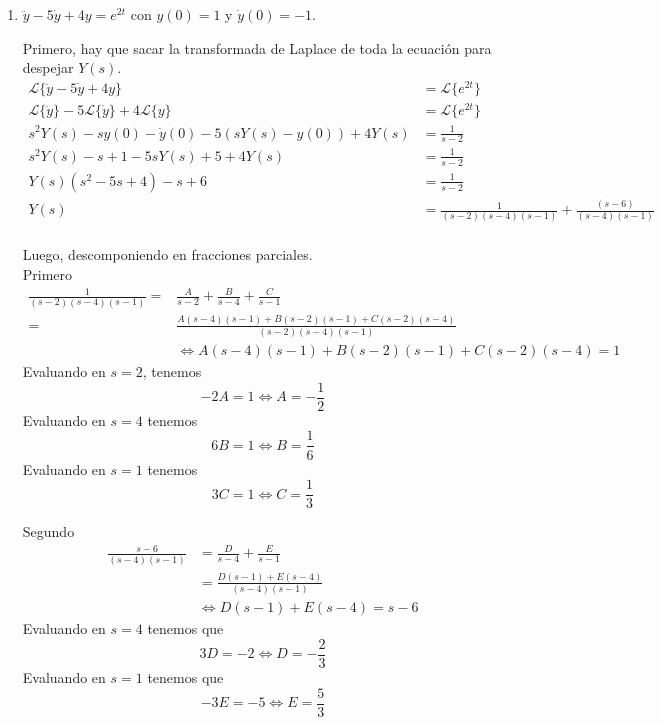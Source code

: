 \documentclass{article}
\begin{document}
\begin{enumerate}
        \item {
        	$\ddot y - 5 \dot y + 4y = e^{2t}$ con $y(0) = 1$ y $\dot y(0) = -1$.
        	
        	\color{azul}
        	Primero, hay que sacar la transformada de Laplace de toda la ecuación
        	para despejar $Y(s)$.
        	\begin{align*}
        	\mathcal{L}\{\ddot y - 5 \dot y + 4y\} &= \mathcal{L}\{e^{2t}\} \\
        	\mathcal{L}\{\ddot y\} - 5\mathcal{L}\{\dot y\} + 4 \mathcal{L}\{y\}
        	&= \mathcal{L}\{e^{2t}\} \\
        	s^2 Y(s) - s y(0) - \dot y(0) - 5 (sY(s) - y(0)) + 4Y(s) 
        	&= \frac{1}{s - 2} \\
        	s^2 Y(s) - s + 1 - 5s Y(s) + 5 + 4 Y(s) &= \frac{1}{s - 2} \\
        	Y(s) (s^2 - 5s + 4) - s + 6 &= \frac{1}{s - 2} \\
        	Y(s) &= \frac{1}{(s-2)(s-4)(s-1)} + \frac{(s-6)}{(s-4)(s-1)}\\
        	\end{align*}
        	
        	Luego, descomponiendo en fracciones parciales.\\
        	Primero
        	\begin{align*}
        	\frac{1}{(s-2)(s-4)(s-1)}=&\frac{A}{s-2} + \frac{B}{s-4} + \frac{C}{s-1} \\
        	=&\frac{A(s-4)(s-1) + B(s-2)(s-1) + C(s-2)(s-4)}{(s-2)(s-4)(s-1)} \\
        	&\iff A(s-4)(s-1) + B(s-2)(s-1) + C(s-2)(s-4) = 1
        	\end{align*}
        	Evaluando en $s = 2$, tenemos
        	\[-2A = 1 \iff A = -\frac{1}{2}\]
        	Evaluando en $s = 4$ tenemos
        	\[6B = 1 \iff B = \frac{1}{6}\]
        	Evaluando en $s = 1$ tenemos
        	\[3C = 1 \iff C = \frac{1}{3}\]
        	
        	Segundo
        	\begin{align*}
        	\frac{s-6}{(s-4)(s-1)} &= \frac{D}{s-4} + \frac{E}{s-1} \\
        	&= \frac{D(s-1) + E(s-4)}{(s-4)(s-1)} \\
        	&\iff D(s-1) + E(s-4) = s-6
        	\end{align*}
        	Evaluando en $s = 4$ tenemos que
        	\[3D = -2 \iff D = -\frac{2}{3}\]
        	Evaluando en $s = 1$ tenemos que
        	\[-3E = -5 \iff E = \frac{5}{3}\]
        	
}
\end{enumerate}
\end{document}
